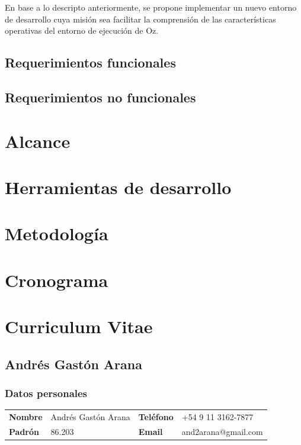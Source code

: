 \documentclass[a4paper,11pt]{article}
\begin{document}
En base a lo descripto anteriormente, se propone implementar un nuevo entorno
de desarrollo cuya misión sea facilitar la comprensión de las características
operativas del entorno de ejecución de Oz.

\subsection{Requerimientos funcionales}

\subsection{Requerimientos no funcionales}

\section{Alcance}

\section{Herramientas de desarrollo}

\section{Metodología}

\section{Cronograma}

\section{Curriculum Vitae}

\subsection{Andrés Gastón Arana}

\subsubsection{Datos personales}

\noindent \begin{tabular}{l l l l}
  \textbf{Nombre} & Andrés Gastón Arana & \textbf{Teléfono} & +54 9 11 3162-7877\\
  \textbf{Padrón} & 86.203              & \textbf{Email}    & and2arana@gmail.com \\
\end{tabular}
\end{document}
